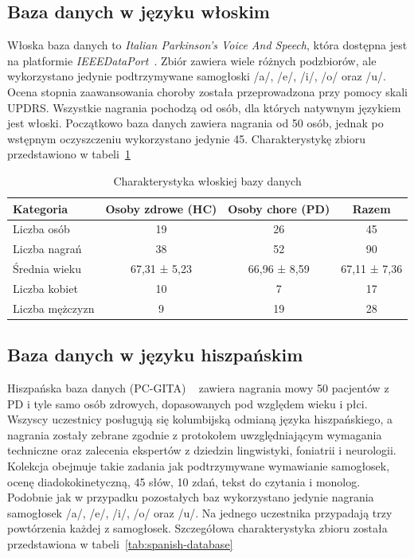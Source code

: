 \subsection{Baza danych w języku włoskim}
\label{subsec:wloska-baza}

Włoska baza danych to \emph{Italian Parkinson's Voice And Speech}, która dostępna jest na platformie \emph{IEEEDataPort}~\cite{italian-database}.
Zbiór zawiera wiele różnych podzbiorów, ale wykorzystano jedynie podtrzymywane samogłoski /a/, /e/, /i/, /o/ oraz /u/.
Ocena stopnia zaawansowania choroby została przeprowadzona przy pomocy skali UPDRS\@.
Wszystkie nagrania pochodzą od osób, dla których natywnym językiem jest włoski.
Początkowo baza danych zawiera nagrania od 50 osób, jednak po wstępnym oczyszczeniu wykorzystano jedynie 45.
Charakterystykę zbioru przedstawiono w tabeli~\ref{tab:italian-database}

\begin{table}[h]
\centering
\caption{Charakterystyka włoskiej bazy danych}
\label{tab:italian-database}
\begin{tabular}{|l|c|c|c|}
\hline
\textbf{Kategoria} &\textbf{Osoby zdrowe (HC)} &\textbf{Osoby chore (PD)} &\textbf{Razem} \\ \hline
Liczba osób &19 &26 &45\\ \hline
Liczba nagrań &38 &52 &90\\ \hline
Średnia wieku &67,31 ± 5,23 &66,96 ± 8,59  & 67,11 ± 7,36 \\ \hline
Liczba kobiet &10 &7 &17\\ \hline
Liczba mężczyzn &9 &19 &28 \\ \hline
\end{tabular}
\end{table}


\subsection{Baza danych w języku hiszpańskim}
\label{subsec:hiszpanska-baza}


Hiszpańska baza danych (PC-GITA) ~\cite{pc-gita} zawiera nagrania mowy 50 pacjentów z PD i tyle samo osób zdrowych, dopasowanych pod względem wieku i płci.
Wszyscy uczestnicy posługują się kolumbijską odmianą języka hiszpańskiego, a nagrania zostały zebrane zgodnie z protokołem uwzględniającym wymagania techniczne oraz zalecenia ekspertów z dziedzin lingwistyki, foniatrii i neurologii.
Kolekcja obejmuje takie zadania jak podtrzymywane wymawianie samogłosek, ocenę diadokokinetyczną, 45 słów, 10 zdań, tekst do czytania i monolog.
Podobnie jak w przypadku pozostałych baz wykorzystano jedynie nagrania samogłosek /a/, /e/, /i/, /o/ oraz /u/.
Na jednego uczestnika przypadają trzy powtórzenia każdej z samogłosek.
Szczegółowa charakterystyka zbioru została przedstawiona w tabeli~\ref{tab:spanish-database}

